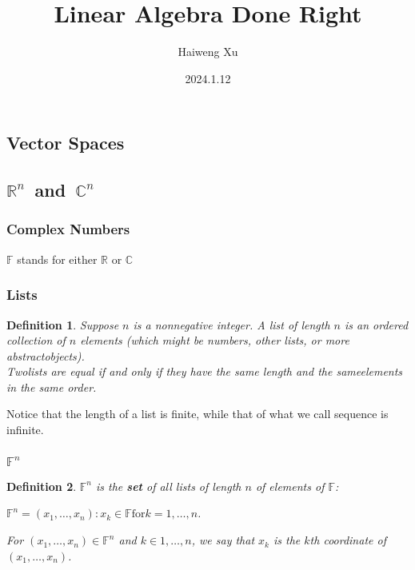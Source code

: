 \documentclass{article}
\title{Linear Algebra Done Right}
\author{Haiweng Xu}
\date{2024.1.12}
\newtheorem{definition}{Definition}[subsection]
\newcommand{\RR}{\mathbb{R}}
\newcommand{\CC}{\mathbb{C}}
\newcommand{\FF}{\mathbb{F}}
\begin{document}
\begin{CJK}{UTF8}{gkai}

\maketitle
\tableofcontents

\section{Vector Spaces}

\subsection{$\RR^n$~and~$\CC^n$ }

\subsubsection{Complex Numbers}
$\FF$ stands for either $\RR$ or $\CC$\\

\subsubsection{Lists}

\begin{definition}
    Suppose $n$ is a nonnegative integer. A list of length $n$ is an ordered collection of $n$ elements (which might be numbers, other lists, or more abstractobjects).\\

    Twolists are equal if and only if they have the same length and the sameelements in the same order.
\end{definition}

Notice that the length of a list is finite, while that of what we call sequence is infinite. 

\subsubsection{$\FF^n$}

\begin{definition}
    $\FF^n$ is the \textbf{set} of all lists of length $n$ of elements of $\FF$:

    $\FF^n = {(x_1,\ldots,x_n) : x_k \in \FF \text{for} k = 1,\ldots,n}$.

    For $(x_1,\ldots,x_n) \in \FF^n$ and $k \in {1,\ldots,n}$, we say that $x_k$ is the $k$th coordinate of
    $(x_1, \ldots,x_n)$.
\end{definition}


\end{CJK}
\end{document}
